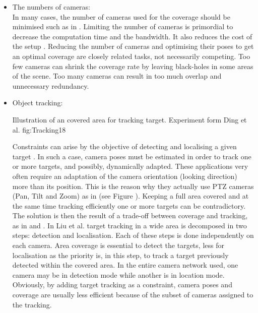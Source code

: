\begin{itemize}
\item  The numbers of cameras: \\ In many cases,  the number of cameras used for the coverage should be minimised such as in  \cite{151*zhao2013,171*horster2006,22*zhao2008}. Limiting the number of cameras is primordial to decrease the computation time and the bandwidth. It also reduces the cost of the setup \cite{82*chrysostomou2012}. Reducing the number of cameras and optimising their poses to get an optimal coverage are closely related tasks, not necessarily competing. Too few cameras can shrink the coverage rate by leaving black-holes in some areas of the scene. Too many cameras can result in too much overlap and unnecessary redundancy.\\

\item Object tracking: \\
\begin{mfigures}[!]{Illustration of an covered area for tracking target. Experiment  form Ding et al. \citep{18*ding2012} }{fig:Tracking18} \centering
{}
\hspace{1cm} \\
\end{mfigures}	
 Constraints can arise by the objective of detecting and localising a given target \cite{18*ding2012,12*soto2009,23*liu2009,39*wu2011,40*sohrabi2000,22*zhao2008}. In such a case, camera poses must be estimated in order to track one or more targets, and possibly, dynamically adapted. These applications very often require an adaptation of the camera orientation (looking direction) more than its position. This is the reason why they actually use PTZ cameras (Pan, Tilt and Zoom) as in \cite{18*ding2012,38*liu2010,12*soto2009} (see Figure \citep{18*ding2012}).
Keeping a full area covered and at the same time tracking efficiently one or more targets can be contradictory. The solution is then the result of a trade-off between coverage and tracking, as in \cite{18*ding2012} and \cite{38*liu2010}.
 In Liu et al. \cite{38*liu2010} target tracking in a wide area is decomposed in two steps: detection and localisation. Each of these steps is done independently on each camera. Area coverage is essential to detect the targets, less for localisation as the priority is, in this step, to track a target previously detected within the covered area. In the entire camera network used, one camera may be in detection mode while another is in location mode. Obviously, by adding target tracking as a constraint, camera poses and coverage are usually less efficient because of the subset of cameras assigned to the tracking.  \\


\end{itemize}
